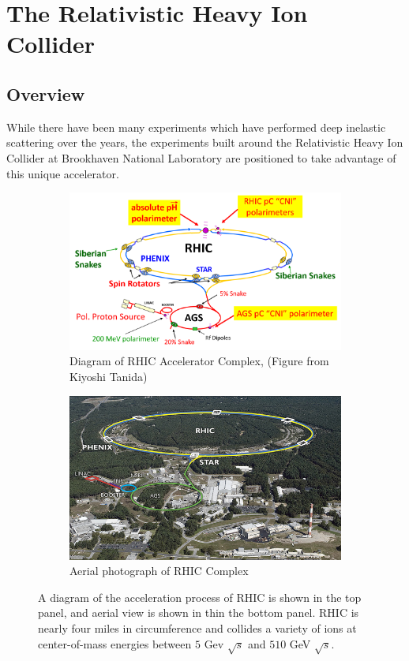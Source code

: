 \chapter{The Relativistic Heavy Ion Collider}

\section{Overview}
While there have been many experiments which have performed deep inelastic
scattering over the years, the experiments built around the Relativistic Heavy
Ion Collider at Brookhaven National Laboratory are positioned to take advantage
of this unique accelerator. 

\begin{figure}[ht]
  \centering
  \begin{subfigure}[b]{\textwidth}
    \centering
    \includegraphics[width=0.8\linewidth]{./figures/kiyoshi_tanida_rhic_schematic.png}
    \caption{Diagram of RHIC Accelerator Complex, (Figure from Kiyoshi Tanida)}
    \label{fig:rhic_schematic} 
  \end{subfigure}
  \begin{subfigure}[b]{\textwidth}
    \centering
    \includegraphics[width=0.8\linewidth]{./figures/7979381212_fddf3f1ab4_z.jpg}
    \caption{Aerial photograph of RHIC Complex \cite{BNLFlickr2011}}
    \label{fig:rhic_aerial}
  \end{subfigure}
  \caption{
		A diagram of the acceleration process of RHIC is shown in the top panel, and
		aerial view is shown in thin the bottom panel. RHIC is nearly four miles in
		circumference and collides a variety of ions at center-of-mass energies
		between $5$ Gev $\sqrt{s}$  and $510$ GeV $\sqrt{s}$.
  }
  \label{fig:rhic_complex}
\end{figure}

